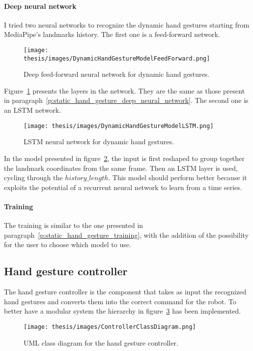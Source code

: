 \documentclass[../thesis.tex]{subfiles}
\begin{document}
\paragraph{Deep neural network}
I tried two neural networks to recognize the dynamic hand gestures starting from MediaPipe's landmarks history. The first one is a feed-forward network.
\begin{figure}[H]
    \centering
    \texttt{[image: thesis/images/DynamicHandGestureModelFeedForward.png]}
    \caption{Deep feed-forward neural network for dynamic hand gestures.}
    \label{fig:ff_model_dynamic_hand_gestures}
\end{figure}
Figure~\ref{fig:ff_model_dynamic_hand_gestures} presents the layers in the network.  They are the same as those present in paragraph~\ref{p:static_hand_gesture_deep_neural_network}.
The second one is an \acrshort{LSTM} network.
\begin{figure}[H]
    \centering
    \texttt{[image: thesis/images/DynamicHandGestureModelLSTM.png]}
    \caption{\acrshort{LSTM} neural network for dynamic hand gestures.}
    \label{fig:lstm_model_dynamic_hand_gestures}
\end{figure}
In the model presented in figure~\ref{fig:lstm_model_dynamic_hand_gestures}, the input is first reshaped to group together the landmark coordinates from the same frame. Then an LSTM layer is used, cycling through the  $history\_length$. This model should perform better because it exploits the potential of a recurrent neural network to learn from a time series.

\paragraph{Training}
The training is similar to the one presented in paragraph~\ref{p:static_hand_gesture_training}, with the addition of the possibility for the user to choose which model to use.

\subsection{Hand gesture controller}\label{ss:hand_gesture_controller}
The hand gesture controller is the component that takes as input the recognized hand gestures and converts them into the correct command for the robot. To better have a modular system the hierarchy in figure~\ref{fig:controller-class-diagram} has been implemented.

\begin{figure}[H]
    \centering
    \texttt{[image: thesis/images/ControllerClassDiagram.png]}
    \caption{UML class diagram for the hand gesture controller.}
    \label{fig:controller-class-diagram}
\end{figure}
\end{document}
